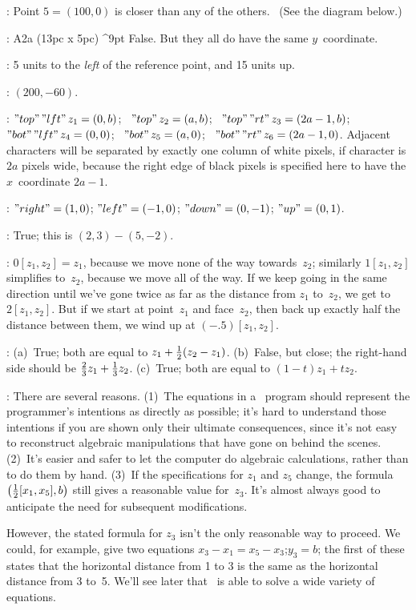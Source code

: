 
:
 Point $5=(100,0)$ is closer than any of the others. \ (See
the diagram below.)

:
 \decreasehsize 15pc
\rightfig A2a (13pc x 5pc) ^9pt
False. But they all do have the same $y$~coordinate.

:
 5 units to the {\sl left\/} of the reference point, and 15 units up.

:
 \restorehsize $(200,-60)$.

:
 $"top"\,"lft"\,z_1=(0,b)$; \ $"top"\,z_2=(a,b)$; \
$"top"\,"rt"\,z_3=(2a-1,b)$; \ $"bot"\,"lft"\,z_4=(0,0)$; \
$"bot"\,z_5=(a,0)$; \ $"bot"\,"rt"\,z_6=(2a-1,0)$.
Adjacent characters will be separated by exactly one column of white
pixels, if character is $2a$ pixels wide, because the right edge of
black pixels is specified here to have the $x$~coordinate $2a-1$.

\ansno2.6:
 $"right"=(1,0)$; $"left"=(-1,0)$; $"down"=(0,-1)$; $"up"=(0,1)$.

\ansno2.7:
 True; this is $(2,3)-(5,-2)$.

:
 $0[z_1,z_2]=z_1$, because we move none of the way towards~$z_2$;
similarly $1[z_1,z_2]$ simplifies to~$z_2$, because we move all of the
way.  If we keep going in the same direction until we've gone twice as far
as the distance from $z_1$ to~$z_2$, we get to $2[z_1,z_2]$. But if we
start at point~$z_1$ and face~$z_2$, then back up exactly half the distance
between them, we wind up at $(-.5)[z_1,z_2]$.

:
 (a)~True; both are equal to $z_1+{1\over2}(z_2-z_1)$.
(b)~False, but close; the right-hand side should be
${2\over3}z_1+{1\over3}z_2$.  (c)~True; both are equal to $(1-t)z_1+tz_2$.

\ansno2.10:
 There are several reasons. (1)~The equations in a \MF\ program
should represent the programmer's intentions as directly as possible;
it's hard to understand those intentions if you are shown only
their ultimate consequences, since it's not easy to reconstruct algebraic
manipulations that have gone on behind the scenes. (2)~It's easier and
safer to let the computer do algebraic calculations, rather than
to do them by hand. (3)~If the specifications for $z_1$ and $z_5$ change,
the formula $\bigl({1\over2}[x_1,x_5],b\bigr)$
still gives a reasonable value for~$z_3$. It's
almost always good to anticipate the need for subsequent modifications.\par
However, the stated formula for $z_3$ isn't the only reasonable way to
proceed. We could, for example, give two equations
\begindisplay
$x_3-x_1=x_5-x_3$;\qquad $y_3=b$;
\enddisplay
the first of these states that the horizontal distance from 1 to 3 is
the same as the horizontal distance from 3 to~5. We'll see later that
\MF\ is able to solve a wide variety of equations.

